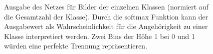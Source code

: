 \begin{figure}[h!]
  \hspace{8pt}
  \hspace{8pt}
  \renewcommand{\baselinestretch}{1.0}
  \caption{Ausgabe des Netzes für Bilder der einzelnen Klassen (normiert auf die Gesamtzahl der Klasse). Durch die softmax Funktion kann der Ausgabewert als Wahrscheinlichkeit für die Angehörigkeit zu einer Klasse interpretiert werden. Zwei Bins der Höhe 1 bei 0 und 1 würden eine perfekte Trennung repräsentieren.}
  \renewcommand{\baselinestretch}{1.5}
\end{figure}
%
